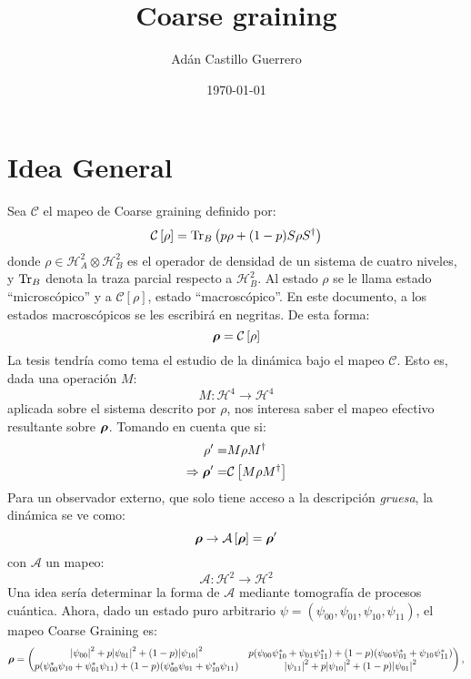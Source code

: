 \documentclass{article}
\title{Coarse graining}
\author{Adán Castillo Guerrero}
\date{\today}
\newcommand{\Cc}{\mathcal{C}} %
\newcommand{\Hh}{\mathcal{H}} %
\newcommand{\CG}[1]{\Cc\left[#1\right]}
\newcommand*{\B}[1]{\ifmmode\bm{#1}\else\textbf{#1}\fi}
\begin{document}
\section{Idea General}
Sea $\Cc$ el mapeo de Coarse graining definido por:
\begin{equation}
    \Cc\left[\rho\right]=\Tr_{B}\left(p\rho+(1-p)S\rho S^{\dag}\right)
\end{equation}
donde $\rho\in \Hh^{2}_{A}\otimes \Hh^{2}_{B}$ es el operador de densidad de un sistema de cuatro niveles, y $\Tr_{B}$ denota la traza parcial respecto a $\Hh^{2}_{B}$. Al estado $\rho$ se le llama estado ``microscópico'' y a $\CG{\rho}$, estado ``macroscópico''. En este documento, a los estados macroscópicos se les escribirá en negritas. De esta forma:
\begin{equation}
    \B{\rho}=\CG{\rho}
\end{equation}
La tesis tendría como tema el estudio de la dinámica bajo el mapeo $\Cc$. Esto es, dada una operación $M$:
\begin{equation}
    M:\Hh^{4}\rightarrow\Hh^{4}
\end{equation}
aplicada sobre el sistema descrito por $\rho$, nos interesa saber el mapeo efectivo resultante sobre $\B{\rho}$. Tomando en cuenta que si:
\begin{align}
    \rho'=&M\rho M^{\dag}\\
    \Rightarrow \B{\rho}'=&\CG{M\rho M^{\dag}}
\end{align}
Para un observador externo, que solo tiene acceso a la descripción \textit{gruesa}, la dinámica se ve como:
\begin{equation}\label{eq:obs}
    \B{\rho}\rightarrow\mathcal{A}\left[\B{\rho}\right]=\B{\rho}'
\end{equation}
con $\mathcal{A}$ un mapeo:
\begin{equation}
    \mathcal{A}:\Hh^{2}\rightarrow\Hh^{2}
\end{equation}
Una idea sería determinar la forma de $\mathcal{A}$ mediante tomografía de procesos cuántica. Ahora, dado un estado puro arbitrario $\psi=(\psi_{00},\psi_{01},\psi_{10},\psi_{11})$, el mapeo Coarse Graining es:
\begin{equation}
    \B{\rho} =
    \begin{pmatrix}
        \abs{\psi_{00}}^{2}+p\abs{\psi_{01}}^{2}+(1-p)\abs{\psi_{10}}^{2} & p(\psi_{00}\psi_{10}^{*}+\psi_{01}\psi_{11}^{*})+(1-p)(\psi_{00}\psi_{01}^{*}+\psi_{10}\psi_{11}^{*})\\
        p(\psi_{00}^{*}\psi_{10}+\psi_{01}^{*}\psi_{11})+(1-p)(\psi_{00}^{*}\psi_{01}+\psi_{10}^{*}\psi_{11}) & \abs{\psi_{11}}^{2}+p\abs{\psi_{10}}^{2}+(1-p)\abs{\psi_{01}}^{2}
    \end{pmatrix},
\end{equation}
\end{document}

